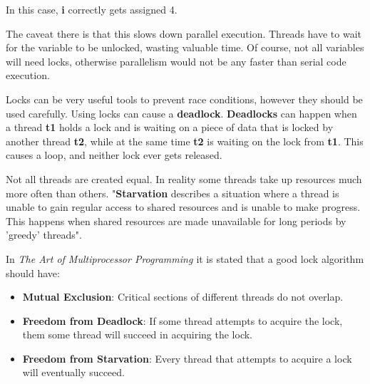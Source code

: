 \documentclass[letterpaper, 12pt]{article}
\begin{document}
In this case, {\bfseries i} correctly gets assigned 4.

\par\vspace{\baselineskip}

The caveat there is that this slows down parallel execution. Threads have to wait for
the variable to be unlocked, wasting valuable time. Of course, not all variables
will need locks, otherwise parallelism would not be any faster than serial code execution.

\par\vspace{\baselineskip}

Locks can be very useful tools to prevent race conditions, however they should be used carefully.
Using locks can cause a {\bfseries deadlock}. {\bfseries Deadlocks} can happen when a thread
{\bfseries t1} holds a lock and is waiting on a piece of data that is locked by another thread
{\bfseries t2}, while at the same time {\bfseries t2} is waiting on the lock from {\bfseries t1}.
This causes a loop, and neither lock ever gets released.

\par\vspace{\baselineskip}

Not all threads are created equal. In reality some threads take up resources much more often than others.
"{\bfseries Starvation} describes a situation where a thread is unable to gain regular access
to shared resources and is unable to make progress. This happens when shared resources are
made unavailable for long periods by 'greedy' threads"\citep{oracleconcurrency}.

\par\vspace{\baselineskip}


In \textit{The Art of Multiprocessor Programming \citep{artofmulti} } it is stated that a good lock algorithm should have:

\begin{itemize}
	\item {\bfseries Mutual Exclusion}: Critical sections of different threads do not overlap.
	\item {\bfseries Freedom from Deadlock}: If some thread attempts to acquire the lock, them some thread will succeed in acquiring the lock.
	\item {\bfseries Freedom from Starvation}: Every thread that attempts to acquire a lock will eventually succeed.
\end{itemize}
\end{document}
